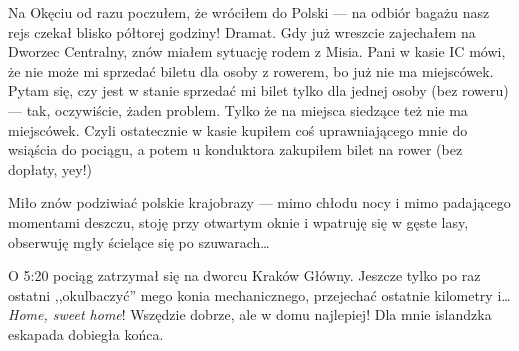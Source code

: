 Na Okęciu od razu poczułem, że wróciłem do Polski --- na odbiór bagażu nasz rejs czekał blisko półtorej godziny! Dramat. Gdy już wreszcie zajechałem na Dworzec Centralny, znów miałem sytuację rodem z Misia. Pani w kasie IC mówi, że nie może mi sprzedać biletu dla osoby z rowerem, bo już nie ma miejscówek. Pytam się, czy jest w stanie sprzedać mi bilet tylko dla jednej osoby (bez roweru) --- tak, oczywiście, żaden problem. Tylko że na miejsca siedzące też nie ma miejscówek. Czyli ostatecznie w kasie kupiłem coś uprawniającego mnie do wsiąścia do pociągu, a potem u konduktora zakupiłem bilet na rower (bez dopłaty, yey!)

Miło znów podziwiać polskie krajobrazy --- mimo chłodu nocy i mimo padającego momentami deszczu, stoję przy otwartym oknie i wpatruję się w gęste lasy, obserwuję mgły ścielące się po szuwarach…

O 5:20 pociąg zatrzymał się na dworcu Kraków Główny. Jeszcze tylko po raz ostatni ,,okulbaczyć'' mego konia mechanicznego, przejechać ostatnie kilometry i… \emph{Home, sweet home}! Wszędzie dobrze, ale w domu najlepiej! Dla mnie islandzka eskapada dobiegła końca.

